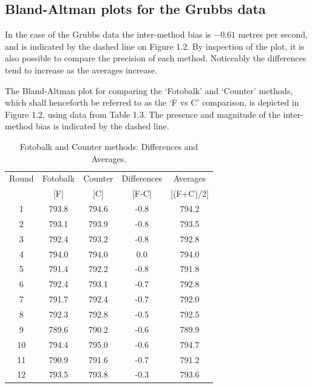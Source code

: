 \documentclass[12pt, a4paper]{report}
\theoremstyle{plain}
\theoremstyle{definition}
\theoremstyle{remark}
\begin{document}
	\newpage
%
%	
\subsection{Bland-Altman plots for the Grubbs data}
In the case of the Grubbs data the inter-method bias is $-0.61$ metres per second, and is indicated by the dashed line on Figure 1.2. By inspection of the plot, it is also possible to compare the precision of each method. Noticeably the differences tend to increase as the averages increase.
	
The Bland-Altman plot for comparing the `Fotobalk' and `Counter' methods, which shall henceforth be referred to as the `F vs C' comparison,  is depicted in Figure 1.2, using data from Table 1.3.
The presence and magnitude of the inter-method bias is indicated by the dashed line.
	
	
	\begin{table}[h!]
		\renewcommand\arraystretch{0.7}%
		\begin{center}
			\begin{tabular}{|c||c|c||c|c|}
				\hline
				Round & Fotobalk  & Counter  & Differences  & Averages  \\
				&  [F] & [C] & [F-C] &  [(F+C)/2] \\
				\hline
				1 & 793.8 & 794.6 & -0.8 & 794.2 \\
				2 & 793.1 & 793.9 & -0.8 & 793.5 \\
				3 & 792.4 & 793.2 & -0.8 & 792.8 \\
				4 & 794.0 & 794.0 & 0.0 & 794.0 \\
				5 & 791.4 & 792.2 & -0.8 & 791.8 \\
				6 & 792.4 & 793.1 & -0.7 & 792.8 \\
				7 & 791.7 & 792.4 & -0.7 & 792.0 \\
				8 & 792.3 & 792.8 & -0.5 & 792.5 \\
				9 & 789.6 & 790.2 & -0.6 & 789.9 \\
				10 & 794.4 & 795.0 & -0.6 & 794.7 \\
				11 & 790.9 & 791.6 & -0.7 & 791.2 \\
				12 & 793.5 & 793.8 & -0.3 & 793.6 \\
				\hline
			\end{tabular}
			\caption{Fotobalk and Counter methods: Differences and Averages.}
		\end{center}
	\end{table}
	
\end{document}
